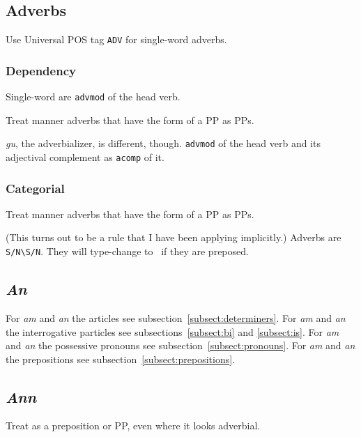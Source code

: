 \documentclass[a4paper]{article}
\begin{document}
\subsection{Adverbs\label{subsect:adverbs}}

Use Universal POS tag \texttt{ADV} for single-word adverbs.

\subsubsection*{Dependency}

 Single-word are \texttt{advmod} of the head verb.

 Treat manner adverbs that have the form of a PP as PPs.

 \textit{gu}, the adverbializer, is different, though.
\texttt{advmod} of the head verb and its adjectival complement as \texttt{acomp} of it.

\subsubsection*{Categorial}


\newcommand{\SsNbSsN}{\texttt{S/N\textbackslash S/N}}

 Treat manner adverbs that have the form of a PP as PPs.

 (This turns out to be a rule that I have been applying implicitly.) 
Adverbs are \SsNbSsN.
They will type-change to \SsS\ if they are preposed.

\subsection{\textit{An}}

For \textit{am} and \textit{an} the articles see subsection~\ref{subsect:determiners}.
For \textit{am} and \textit{an} the interrogative particles see subsections~\ref{subsect:bi} and \ref{subsect:is}.
For \textit{am} and \textit{an} the possessive pronouns see subsection~\ref{subsect:pronouns}.
For \textit{am} and \textit{an} the prepositions see subsection~\ref{subsect:prepositions}.

\subsection{\textit{Ann}}

 Treat as a preposition or PP, even where it looks adverbial.
\end{document}
